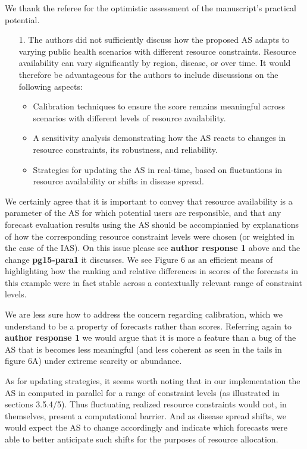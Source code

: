 \documentclass{article}
\begin{document}
We thank the referee for the optimistic assessment of the manuscript's practical potential. 

\begin{quotebar}
\begin{enumerate}
  \item[1.] The authors did not sufficiently discuss how the proposed AS adapts to varying public health scenarios with different resource constraints. Resource availability can vary significantly by region, disease, or over time. It would therefore be advantageous for the authors to include discussions on the following aspects:
    \begin{itemize}
    \item Calibration techniques to ensure the score remains meaningful across scenarios with different levels of resource availability.
    \item A sensitivity analysis demonstrating how the AS reacts to changes in resource constraints, its robustness, and reliability.
    \item Strategies for updating the AS in real-time, based on fluctuations in resource availability or shifts in disease spread.
    \end{itemize}
\end{enumerate}
\end{quotebar}

We certainly agree that it is important to convey that resource availability is a parameter of the AS for which potential users are responsible, and
that any forecast evaluation results using the AS should be accompianied by explanations of how the corresponding resource constraint levels were chosen 
(or weighted in the case of the IAS).  On this issue please see \textbf{author response 1} above and the change \textbf{pg15-para1} it discusses.  We see 
Figure 6 as an efficient means of highlighting how the ranking and relative differences in scores of the forecasts in this example were in fact stable across a
contextually relevant range of constraint levels.

We are less sure how to address the concern regarding calibration, which we understand to be a property of forecasts rather than scores. Referring again to
\textbf{author response 1} we would argue that it is more a feature than a bug of the AS that is becomes less meaningful 
(and less coherent as seen in the tails in figure 6A) under extreme scarcity or abundance.

As for updating strategies, it seems worth noting that in our implementation the AS in computed in parallel for a range of constraint levels 
(as illustrated in sections 3.5.4/5). Thus fluctuating realized resource constraints would not, in themselves, present a computational barrier. And as
disease spread shifts, we would expect the AS to change accordingly and indicate which forecasts were able to better anticipate such shifts for the
purposes of resource allocation.
\end{document}

